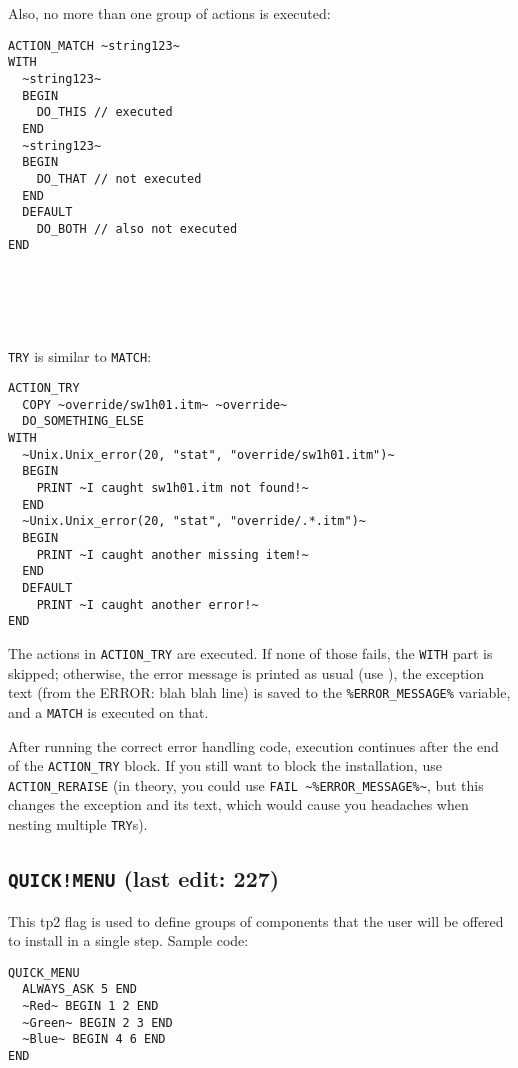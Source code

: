 \documentclass{article}
\def\ttref#1{\ahrefloc{#1}{\tt #1}}
\def\DEFINE#1{{\tt \bf #1}\label{#1}\index{#1}}
\begin{document}
Also, no more than one group of actions is executed:
\begin{verbatim}
ACTION_MATCH ~string123~
WITH
  ~string123~
  BEGIN
    DO_THIS // executed
  END
  ~string123~
  BEGIN
    DO_THAT // not executed
  END
  DEFAULT
    DO_BOTH // also not executed
END
\end{verbatim}
\\
\\
\\
\\
\verb+TRY+ is similar to \verb+MATCH+:
\begin{verbatim}
ACTION_TRY
  COPY ~override/sw1h01.itm~ ~override~
  DO_SOMETHING_ELSE
WITH
  ~Unix.Unix_error(20, "stat", "override/sw1h01.itm")~
  BEGIN
    PRINT ~I caught sw1h01.itm not found!~
  END
  ~Unix.Unix_error(20, "stat", "override/.*.itm")~
  BEGIN
    PRINT ~I caught another missing item!~
  END
  DEFAULT
    PRINT ~I caught another error!~
END
\end{verbatim}

The actions in \verb+ACTION_TRY+ are executed. If none of those fails, the
\verb+WITH+ part is skipped; otherwise, the error message is printed as usual
(use \ttref{SILENT}), the exception text (from the ERROR: blah blah line) is
saved to the \verb+%ERROR_MESSAGE%+ variable, and a \verb+MATCH+ is executed
on that.

After running the correct error handling code, execution continues after the
end of the \verb+ACTION_TRY+ block. If you still want to block the
installation, use \verb+ACTION_RERAISE+ (in theory, you could use
\verb+FAIL ~%ERROR_MESSAGE%~+, but this changes the exception and its text,
which would cause you headaches when nesting multiple \verb+TRY+s).



\subsection{\DEFINE{QUICK!MENU} (last edit: 227)}

This tp2 flag is used to define groups of components that the user will be
offered to install in a single step. Sample code:

\begin{verbatim}
QUICK_MENU
  ALWAYS_ASK 5 END
  ~Red~ BEGIN 1 2 END
  ~Green~ BEGIN 2 3 END
  ~Blue~ BEGIN 4 6 END
END
\end{verbatim}
\end{document}
